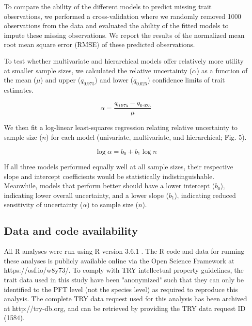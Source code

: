\documentclass{article}
\begin{document}
To compare the ability of the different models to predict missing trait observations,
we performed a cross-validation where we randomly removed 1000 observations from the data
and evaluated the ability of the fitted models to impute these missing observations.
We report the results of the normalized mean root mean square error (RMSE) of these predicted observations.

To test whether multivariate and hierarchical models offer relatively more utility at smaller sample sizes,
we calculated the relative uncertainty ($\alpha$) as a function of the mean ($\mu$) and upper ($q_{0.975}$) and lower ($q_{0.025}$) confidence limits of trait estimates.

\begin{equation}
\alpha = \frac{q_{0.975} - q_{0.025}}{\mu}
\end{equation}

We then fit a log-linear least-squares regression relating relative uncertainty to sample size ($n$) for each model (univariate, multivariate, and hierarchical; Fig. 5).

\begin{equation}
\log{\alpha} = b_0 + b_1 \log{n}
\end{equation}

If all three models performed equally well at all sample sizes, their respective slope and intercept coefficients would be statistically indistinguishable.
Meanwhile, models that perform better should have
a lower intercept ($b_0$), indicating lower overall uncertainty,
and
a lower slope ($b_1$), indicating reduced sensitivity of uncertainty ($\alpha$) to sample size ($n$).

\subsection{Data and code availability}

All R analyses were run using R version 3.6.1 \citep{r_361}.
The R code and data for running these analyses is publicly available online via the Open Science Framework at https://osf.io/w8y73/.
To comply with TRY intellectual property guidelines, the trait data used in this study have been "anonymized" such that they can only be identified to the PFT level (not the species level) as required to reproduce this analysis.
The complete TRY data request used for this analysis has been archived at http://try-db.org, and can be retrieved by providing the TRY data request ID (1584).
\end{document}
